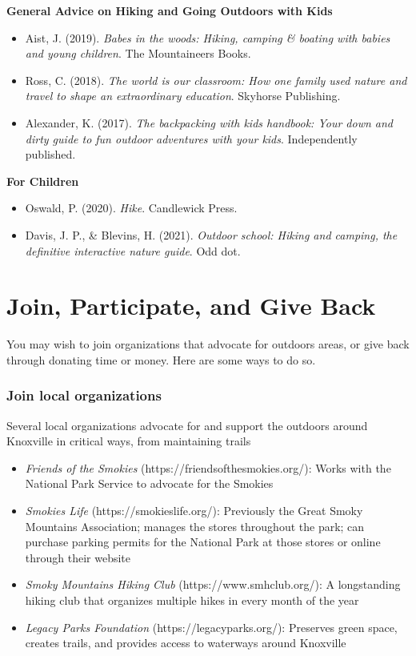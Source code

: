 \documentclass[
  letterpaper,
  DIV=11,
  numbers=noendperiod]{scrreprt}
\providecommand{\tightlist}{%
  \setlength{\itemsep}{0pt}\setlength{\parskip}{0pt}}\usepackage{longtable,booktabs,array}
\begin{document}
\textbf{General Advice on Hiking and Going Outdoors with Kids}

\begin{itemize}
\item
  Aist, J. (2019). \emph{Babes in the woods: Hiking, camping \& boating
  with babies and young children}. The Mountaineers Books.
\item
  Ross, C. (2018). \emph{The world is our classroom: How one family used
  nature and travel to shape an extraordinary education}. Skyhorse
  Publishing.
\item
  Alexander, K. (2017). \emph{The backpacking with kids handbook: Your
  down and dirty guide to fun outdoor adventures with your kids}.
  Independently published.
\end{itemize}

\textbf{For Children}

\begin{itemize}
\item
  Oswald, P. (2020). \emph{Hike}. Candlewick Press.
\item
  Davis, J. P., \& Blevins, H. (2021). \emph{Outdoor school: Hiking and
  camping, the definitive interactive nature guide}. Odd dot.
\end{itemize}

\chapter{Join, Participate, and Give
Back}\label{join-participate-and-give-back}

You may wish to join organizations that advocate for outdoors areas, or
give back through donating time or money. Here are some ways to do so.

\subsection{Join local organizations}\label{join-local-organizations}

Several local organizations advocate for and support the outdoors around
Knoxville in critical ways, from maintaining trails

\begin{itemize}
\tightlist
\item
  \emph{Friends of the Smokies} (https://friendsofthesmokies.org/):
  Works with the National Park Service to advocate for the Smokies
\item
  \emph{Smokies Life} (https://smokieslife.org/): Previously the Great
  Smoky Mountains Association; manages the stores throughout the park;
  can purchase parking permits for the National Park at those stores or
  online through their website
\item
  \emph{Smoky Mountains Hiking Club} (https://www.smhclub.org/): A
  longstanding hiking club that organizes multiple hikes in every month
  of the year
\item
  \emph{Legacy Parks Foundation} (https://legacyparks.org/): Preserves
  green space, creates trails, and provides access to waterways around
  Knoxville
\end{itemize}
\end{document}
